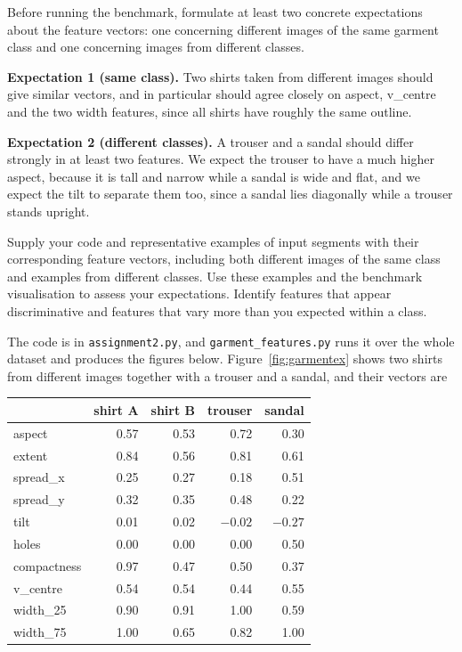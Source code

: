 \documentclass[11pt]{article}
\begin{document}
\begin{question}
Before running the benchmark, formulate at least two concrete expectations
about the feature vectors: one concerning different images of the same garment
class and one concerning images from different classes.
\end{question}

\textbf{Expectation 1 (same class).} Two shirts taken from different images
should give similar vectors, and in particular should agree closely on aspect,
v\_centre and the two width features, since all shirts have roughly the same
outline.

\textbf{Expectation 2 (different classes).} A trouser and a sandal should
differ strongly in at least two features. We expect the trouser to have a much
higher aspect, because it is tall and narrow while a sandal is wide and flat,
and we expect the tilt to separate them too, since a sandal lies diagonally
while a trouser stands upright.

\begin{question}
Supply your code and representative examples of input segments with their
corresponding feature vectors, including both different images of the same
class and examples from different classes. Use these examples and the
benchmark visualisation to assess your expectations. Identify features that
appear discriminative and features that vary more than you expected within a
class.
\end{question}

The code is in \texttt{assignment2.py}, and
\texttt{garment\_features.py} runs it over the whole dataset and produces the
figures below. Figure~\ref{fig:garmentex} shows two shirts from different
images together with a trouser and a sandal, and their vectors are

\begin{table}[H]
    \centering
    \begin{tabular}{lrrrr}
        \toprule
        & shirt A & shirt B & trouser & sandal \\
        \midrule
        aspect      & 0.57 & 0.53 & 0.72 & 0.30 \\
        extent      & 0.84 & 0.56 & 0.81 & 0.61 \\
        spread\_x   & 0.25 & 0.27 & 0.18 & 0.51 \\
        spread\_y   & 0.32 & 0.35 & 0.48 & 0.22 \\
        tilt        & 0.01 & 0.02 & $-0.02$ & $-0.27$ \\
        holes       & 0.00 & 0.00 & 0.00 & 0.50 \\
        compactness & 0.97 & 0.47 & 0.50 & 0.37 \\
        v\_centre   & 0.54 & 0.54 & 0.44 & 0.55 \\
        width\_25   & 0.90 & 0.91 & 1.00 & 0.59 \\
        width\_75   & 1.00 & 0.65 & 0.82 & 1.00 \\
        \bottomrule
    \end{tabular}
\end{table}
\end{document}

